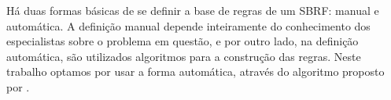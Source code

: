 \documentclass[template.tex]{subfiles}
\begin{document}
Há duas formas básicas de se definir a base de regras de um SBRF: manual e automática. A definição manual depende inteiramente do conhecimento dos especialistas sobre o problema em questão, e por outro lado, na definição automática, são utilizados algoritmos para a construção das regras. Neste trabalho optamos por usar a forma automática, através do algoritmo proposto por .




\end{document}
